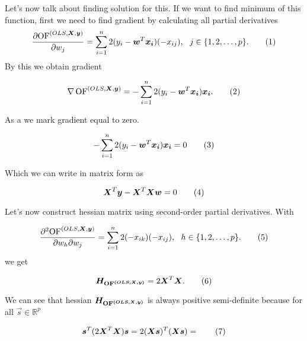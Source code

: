 Let's now talk about finding solution for this. If we want to find minimum of this function, first we need to find gradient by calculating all partial derivatives
\begin{equation}
    \frac{\partial {\of^{(OLS,\vec{X}, \vec{y})}} }{\partial w_j} = \sum\limits_{i=1}^n 2(y_i - \vec{w}^T\vec{x_i})(-x_{ij}) \\, \ \ j \in \{{1,2,\ldots,p\}}. \numberthis
\end{equation}
By this we obtain gradient 

\begin{equation}
    \nabla \of^{(OLS,\vec{X}, \vec{y})} = -\sum\limits_{i=1}^n 2(y_i - \vec{w}^T\vec{x_i})\vec{x_i}. \numberthis
\end{equation}

As a  we mark gradient equal to zero.

\begin{equation}
    -\sum\limits_{i=1}^n 2(y_i - \vec{w}^T\vec{x_i})\vec{x_i} = 0 \numberthis
\end{equation}

Which we can write in matrix form as 

\begin{equation}
    \vec{X}^T\vec{y} - \vec{X}^T\vec{X}\vec{w} = 0 \numberthis  \label{abcd}
\end{equation}


Let's now construct hessian matrix using second-order partial derivatives. With

\begin{equation}
    \frac{\partial^2{\of^{(OLS,\vec{X}, \vec{y})}} }{\partial w_h\partial w_j} = \sum\limits_{i=1}^n 2(- x_{ik})(-x_{ij}) \\, \ \ h \in \{{1,2,\ldots,p\}}. \numberthis
\end{equation}
we get 

\begin{equation}
    \vec{H_{\of^{(OLS,\vec{X}, \vec{y})}}} = 2\vec{X}^T\vec{X}. \numberthis 
\end{equation}

We can see that hessian $\boldsymbol{H_{\operatorname{OF}^{(OLS,\boldsymbol{X}, \boldsymbol{y})}}}$ is always positive semi-definite because for all $\vec{s} \in \mathbb{R}^p$


\begin{equation}
    \vec{s}^T(2\vec{X}^T\vec{X})\vec{s} = 2(\vec{X}\vec{s})^T(\vec{X}\vec{s}) =  \numberthis
\end{equation}

